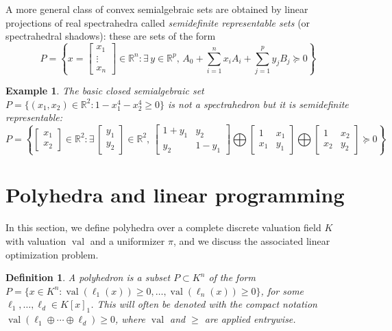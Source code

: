 \documentclass[a4paper,12pt]{article}
\newtheorem{definition}{Definition}
\newtheorem{example}{Example}
\newcommand{\R}{\mathbb{R}} %
\DeclareMathOperator{\val}{val}
\begin{document}
A more general class of convex semialgebraic sets are obtained by linear projections of real spectrahedra
called {\it semidefinite representable sets} (or spectrahedral shadows): these are sets of the form
$$
P = \left\{x = \left[\begin{smallmatrix} x_1 \\ \vdots \\ x_n \end{smallmatrix}\right] \in \R^n : \exists\,y\in\R^p, \, A_0 + \sum_{i=1}^n x_i A_i + \sum_{j=1}^p y_j B_j \succeq 0\right\}
$$

\begin{example}
\label{fermat_quartic}
The basic closed semialgebraic set $P = \{(x_1,x_2) \in \R^2 : 1-x_1^4-x_2^4 \geq 0\}$ is not a spectrahedron
but it is semidefinite representable:
$$
P = \left\{\begin{bmatrix} x_1 \\ x_2 \end{bmatrix} \in \R^2 :
\exists\,
\begin{bmatrix} y_1 \\ y_2 \end{bmatrix} \in \R^2, \,
\begin{bmatrix}
  1+y_1 & y_2 \\
  y_2 & 1-y_1
\end{bmatrix}
\bigoplus
\begin{bmatrix}
  1 & x_1 \\
  x_1 & y_1
\end{bmatrix}
\bigoplus
\begin{bmatrix}
  1 & x_2 \\
  x_2 & y_2
\end{bmatrix}
\succeq 0
\right\}
$$
\end{example}


\section{Polyhedra and linear programming}


In this section, we define polyhedra over a complete discrete valuation field $K$ with valuation $\val$ and a uniformizer $\pi$,
and we discuss the associated linear optimization problem.

\begin{definition}
  A {\it polyhedron} is a subset $P \subset K^n$ of the form
  $P = \{x \in K^n : \val(\ell_1(x))\geq0,\ldots,\val(\ell_n(x))\geq 0\}$,
  for some $\ell_1,\ldots,\ell_d \in K[x]_1$. This will often be denoted with
  the compact notation $\val(\ell_1 \oplus \cdots \oplus \ell_d) \geq 0$, where $\val$
  and $\geq$ are applied entrywise.
\end{definition}
\end{document}
